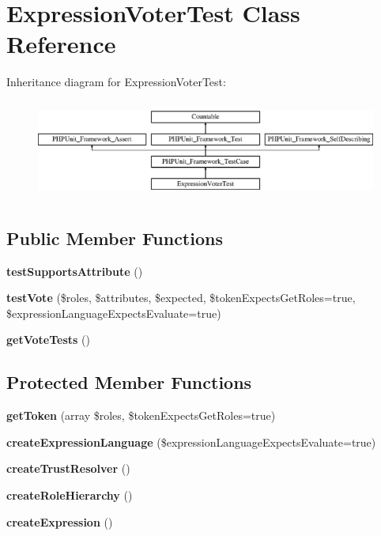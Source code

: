 \section{Expression\+Voter\+Test Class Reference}
\label{class_symfony_1_1_component_1_1_security_1_1_core_1_1_tests_1_1_authorization_1_1_voter_1_1_expression_voter_test}
Inheritance diagram for Expression\+Voter\+Test\+:\begin{figure}[H]
\begin{center}
\leavevmode
\includegraphics[height=3.303835cm]{class_symfony_1_1_component_1_1_security_1_1_core_1_1_tests_1_1_authorization_1_1_voter_1_1_expression_voter_test}
\end{center}
\end{figure}
\subsection*{Public Member Functions}
\begin{DoxyCompactItemize}
\item 
{\bf test\+Supports\+Attribute} ()
\item 
{\bf test\+Vote} (\$roles, \$attributes, \$expected, \$token\+Expects\+Get\+Roles=true, \$expression\+Language\+Expects\+Evaluate=true)
\item 
{\bf get\+Vote\+Tests} ()
\end{DoxyCompactItemize}
\subsection*{Protected Member Functions}
\begin{DoxyCompactItemize}
\item 
{\bf get\+Token} (array \$roles, \$token\+Expects\+Get\+Roles=true)
\item 
{\bf create\+Expression\+Language} (\$expression\+Language\+Expects\+Evaluate=true)
\item 
{\bf create\+Trust\+Resolver} ()
\item 
{\bf create\+Role\+Hierarchy} ()
\item 
{\bf create\+Expression} ()
\end{DoxyCompactItemize}

